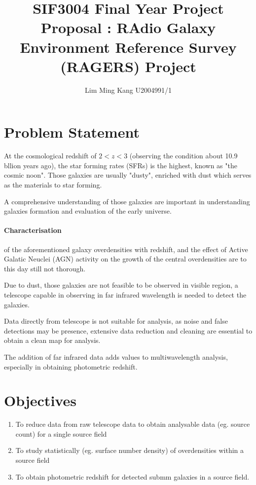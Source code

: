 \documentclass{article}
\title{SIF3004 Final Year Project Proposal : RAdio Galaxy Environment Reference Survey (RAGERS) Project }
\author{Lim Ming Kang U2004991/1}
\begin{document}
\maketitle
\section{Problem Statement}

At the cosmological redshift of $2 < z < 3$ (observing the condition about 10.9 bllion years ago), the star forming rates (SFRs) is the highest, known as "the cosmic noon"\cite{Schreiber2020}.
Those galaxies are usually "dusty", enriched with dust which serves as the materials to star forming.
\medskip

\noindent A comprehensive understanding of those galaxies are important in understanding galaxies formation and evaluation of the early universe.\cite{Geach2016}


\paragraph{Characterisation} of the aforementioned galaxy overdensities with redshift, and the effect of Active Galatic Neuclei (AGN) activity on the growth of the central overdensities are to this day still not thorough.\cite{Ragers2021}
\medskip

\noindent Due to dust, those galaxies are not feasible to be observed in visible region, a telescope capable in observing in far infrared wavelength is needed to detect the galaxies.
\medskip

\noindent Data directly from telescope is not suitable for analysis, as noise and false detections may be presence, extensive data reduction and cleaning are essential to obtain a clean map for analysis. 
\medskip

\noindent The addition of far infrared data adds values to multiwavelength analysis, especially in obtaining photometric redshift.

\section{Objectives}
\begin{enumerate}
    \item To reduce data from raw telescope data to obtain analysable data (eg. source count) for a single source field
    \item To study statistically (eg. surface number density) of overdensities within a source field
    \item To obtain photometric redshift for detected submm galaxies in a source field.
\end{enumerate}
\end{document}
